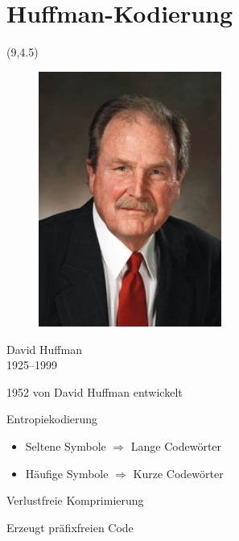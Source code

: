 \documentclass[xcolor=dvipsnames,presentation]{beamer}    %
\newenvironment{witemize}{\itemize\setlength{\itemsep}{1em}}{\enditemize}
\begin{document}

\section{Huffman-Kodierung}

\begin{frame}{\insertsection}
  \begin{textblock}{8}(9,4.5)
    \begin{figure}
      \includegraphics[width=6cm]{bilder/huffman.jpg}
    \end{figure}
    \vspace{-1em}
    \begin{center}
      David Huffman\\
      {\small1925--1999}
    \end{center}
  \end{textblock}

  \begin{witemize}
    \item 1952 von David Huffman entwickelt
    \item Entropiekodierung
      \begin{itemize}
        \item Seltene Symbole $\Rightarrow$ Lange Codewörter
        \item Häufige Symbole $\Rightarrow$ Kurze Codewörter
      \end{itemize}
    \item Verlustfreie Komprimierung
    \item Erzeugt präfixfreien Code
  \end{witemize}
\end{frame}
\end{document}
